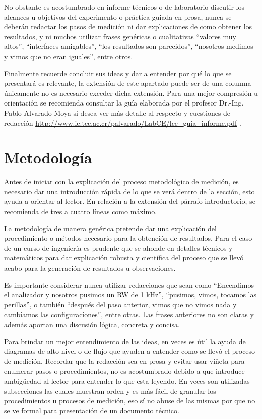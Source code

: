 \documentclass[conference]{IEEEtran}
\begin{document}
No obstante es acostumbrado en informe técnicos o de laboratorio discutir los alcances u objetivos del experimento o práctica guiada en prosa, nunca se deberán redactar los pasos de medición ni dar explicaciones de como obtener los resultados, y ni muchos utilizar frases genéricas o cualitativas ``valores muy altos'', ``interfaces amigables'', ``los resultados son parecidos'', ``nosotros medimos y vimos que no eran iguales'', entre otros.

Finalmente recuerde concluir sus ideas y dar a entender por qué lo que se presentará es relevante, la extensión de este apartado puede ser de una columna únicamente no es necesario exceder dicha extensión. Para una mejor compresión u orientación se recomienda consultar la guía elaborada por el profesor Dr.-Ing. Pablo Alvarado-Moya si desea ver más detalle al respecto y cuestiones de redacción \underline{\url{http://www.ie.tec.ac.cr/palvarado/LabCE/lce_guia_informe.pdf}} \cite{Pablo2018}.

\section{Metodología}
Antes de iniciar con la explicación del proceso metodológico de medición, es necesario dar una introducción rápida de lo que se verá dentro de la sección, esto ayuda a orientar al lector. En relación a la extensión del párrafo introductorio, se recomienda de tres a cuatro líneas como máximo.

La metodología de manera genérica pretende dar una explicación del procedimiento o métodos necesario para la obtención de resultados. Para el caso de un curso de ingeniería es prudente que se ahonde en detalles técnicos y matemáticos para dar explicación robusta y científica del proceso que se llevó acabo para la generación de resultados u observaciones.

Es importante considerar nunca utilizar redacciones que sean como ``Encendimos el analizador y nosotros pusimos un RW de 1 kHz'', ``pusimos, vimos, tocamos las perillas'', o también ``después del paso anterior, vimos que no vimos nada y cambiamos las configuraciones'', entre otras. Las frases anteriores no son claras y además aportan una discusión lógica, concreta y concisa. 

Para brindar un mejor entendimiento de las ideas, en veces es útil la ayuda de diagramas de alto nivel o de flujo que ayuden a entender como se llevó el proceso de medición. Recordar que la redacción sea en prosa y evitar usar viñeta para enumerar pasos o procedimientos, no es acostumbrado debido a que introduce ambigüedad al lector para entender lo que esta leyendo. En veces son utilizadas subsecciones las cuales muestran orden y es más fácil de granular los procedimientos u procesos de medición, eso sí no abuse de las mismas por que no se ve formal para presentación de un documento técnico.
\end{document}

